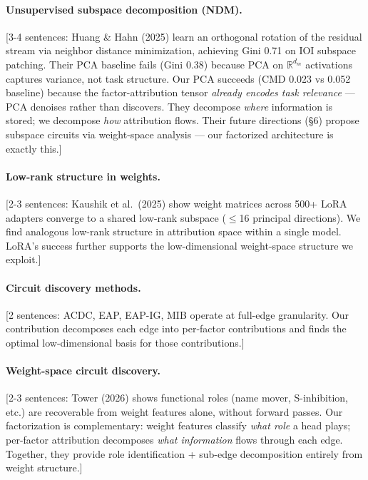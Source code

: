 \documentclass[11pt]{article}
\begin{document}
\paragraph{Unsupervised subspace decomposition (NDM).}
[3-4 sentences: Huang \& Hahn (2025) learn an orthogonal rotation of
the residual stream via neighbor distance minimization, achieving Gini
0.71 on IOI subspace patching. Their PCA baseline fails (Gini 0.38)
because PCA on $\mathbb{R}^{d_m}$ activations captures variance, not
task structure. Our PCA succeeds (CMD 0.023 vs 0.052 baseline) because
the factor-attribution tensor \emph{already encodes task relevance} ---
PCA denoises rather than discovers. They decompose \emph{where}
information is stored; we decompose \emph{how} attribution flows.
Their future directions (\S6) propose subspace circuits via weight-space
analysis --- our factorized architecture is exactly this.]

\paragraph{Low-rank structure in weights.}
[2-3 sentences: Kaushik et al.\ (2025) show weight matrices across 500+
LoRA adapters converge to a shared low-rank subspace ($\leq$16 principal
directions). We find analogous low-rank structure in attribution space
within a single model. LoRA's success further supports the low-dimensional
weight-space structure we exploit.]

\paragraph{Circuit discovery methods.}
[2 sentences: ACDC, EAP, EAP-IG, MIB operate at full-edge granularity.
Our contribution decomposes each edge into per-factor contributions and
finds the optimal low-dimensional basis for those contributions.]

\paragraph{Weight-space circuit discovery.}
[2-3 sentences: Tower (2026) shows functional roles (name mover,
S-inhibition, etc.) are recoverable from weight features alone, without
forward passes. Our factorization is complementary: weight features
classify \emph{what role} a head plays; per-factor attribution
decomposes \emph{what information} flows through each edge. Together,
they provide role identification + sub-edge decomposition entirely from
weight structure.]
\end{document}
